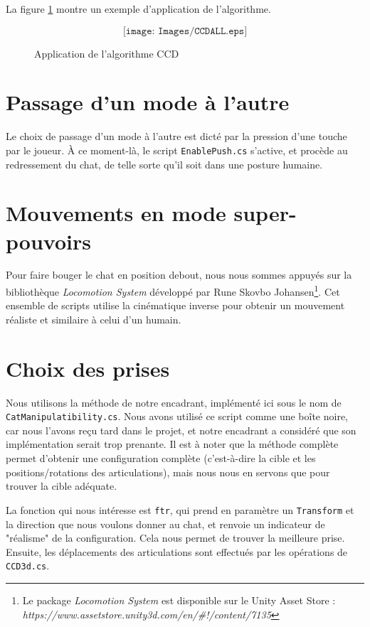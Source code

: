 \documentclass[a4paper,11pt]{article}
\begin{document}
La figure \ref{ccd} montre un exemple d'application de l'algorithme.

\begin{figure}[htbp]
	$$
	\texttt{[image: Images/CCDALL.eps]}
	$$
	\caption{Application de l'algorithme CCD}
	\label{ccd}
\end{figure}


\section{Passage d'un mode à l’autre}
Le choix de passage d'un mode à l'autre est dicté par la pression d'une touche par le joueur. À ce moment-là, le script \texttt{EnablePush.cs} s'active, et procède au redressement du chat, de telle sorte qu'il soit dans une posture humaine. 

\section{Mouvements en mode super-pouvoirs}
Pour faire bouger le chat en position debout, nous nous sommes appuyés sur la bibliothèque \textit{Locomotion System} développé par Rune Skovbo Johansen\footnote{Le package \textit{Locomotion System} est disponible sur le Unity Asset Store : \textit{https://www.assetstore.unity3d.com/en/\#!/content/7135}}. Cet ensemble de scripts utilise la cinématique inverse pour obtenir un mouvement réaliste et similaire à celui d'un humain.

\section{Choix des prises}
Nous utilisons la méthode de notre encadrant, implémenté ici sous le nom de \texttt{CatManipulatibility.cs}. Nous avons utilisé ce script comme une boîte noire, car nous l'avons reçu tard dans le projet, et notre encadrant a considéré que son implémentation serait trop prenante. Il est à noter que la méthode complète permet d'obtenir une configuration complète (c'est-à-dire la cible et les positions/rotations des articulations), mais nous nous en servons que pour trouver la cible adéquate. 

La fonction qui nous intéresse est \texttt{ftr}, qui prend en paramètre un \texttt{Transform} et la direction que nous voulons donner au chat, et renvoie un indicateur de "réalisme" de la configuration. Cela nous permet de trouver la meilleure prise. Ensuite, les déplacements des articulations sont effectués par les opérations de \texttt{CCD3d.cs}. 
\end{document}
